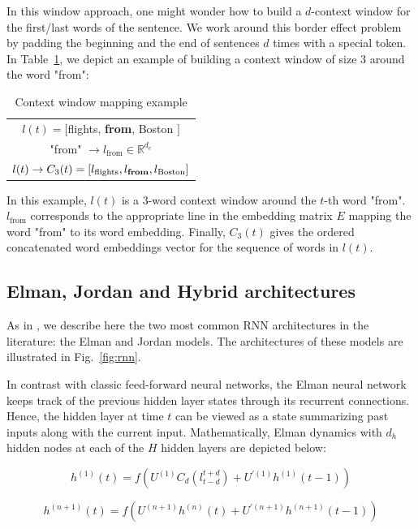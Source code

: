 In this window approach, one might wonder how to build a $d$-context window for
the first/last words of the sentence. We work around this border effect problem
by padding the beginning and the end of sentences $d$ times with a special token.
In Table~\ref{fig:cwmap}, we depict an example of building a context window of size $3$ around the
word "from":

\begin{table}
\centering
\begin{tabular}{c}
$l(t)=[$flights, {\bf from}, Boston $]$ \\
"from" $\rightarrow l_{\textrm{from}}\in\mathbb{R}^{d_e}$ \\
$l(t)\rightarrow C_{3}(t)=[l_{\textrm{flights}}, l_{\textrm{{\bf from}}}, l_{\textrm{Boston}}]$
\end{tabular}
\caption{
\label{fig:cwmap}
Context window mapping example}
\end{table}

In this example, $l(t)$ is a $3$-word context window around the $t$-th word
"from".  $l_{\textrm{from}}$ corresponds to the appropriate line in the
embedding matrix $E$ mapping the word "from" to its word embedding. Finally,
$C_3 (t)$ gives the ordered concatenated word embeddings vector for the
sequence of words in $l(t)$.

\subsection{Elman, Jordan and Hybrid architectures}

As in \citep{rnn15}, we describe here the two most common RNN architectures in the
literature: the Elman \citep{rnn16} and Jordan \citep{rnn17} models. The architectures of these
models are illustrated in Fig.~\ref{fig:rnn}.

In contrast with classic feed-forward neural networks, the Elman neural network
keeps track of the previous hidden layer states through its recurrent
connections. Hence, the hidden layer at time $t$ can be viewed as a state
summarizing past inputs along with the current input. Mathematically, Elman
dynamics with $d_h$ hidden nodes at each of the $H$ hidden layers are depicted
below:

\begin{equation}
h^{(1)}(t) = f(U^{(1)}C_{d}(l_{t-d}^{t+d})+U^{'(1)}h^{(1)}(t-1))
\end{equation}

\begin{equation}
h^{(n+1)}(t) = f(U^{(n+1)}h^{(n)}(t) + U^{'(n+1)}h^{(n+1)}(t-1))
\end{equation}


